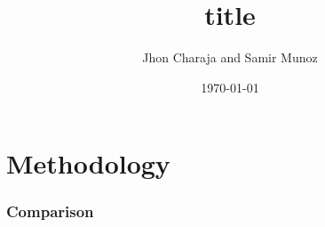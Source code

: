 

\title[Article presentation]{title}

\author[J. Charaja and S. Munoz]{Jhon Charaja and Samir Munoz}
\date{\today}



	\frame{\titlepage}
	\section{Methodology}
	\graphicspath{{images/methodology/PD_lambda_0/}}
	\begin{frame}
		\frametitle{Comparison}
		\begin{minipage}[t]{0.325\textwidth}
			\centering
		\end{minipage}
		\begin{minipage}[t]{0.325\textwidth}
			\centering
		\end{minipage}
		\begin{minipage}[t]{0.325\textwidth}
			\centering
		\end{minipage}				
	\end{frame}
